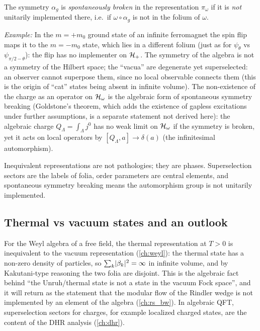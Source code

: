 \begin{definition}
The symmetry $\alpha_g$ is \emph{spontaneously broken} in the representation $\pi_\omega$ if it is \emph{not} unitarily implemented there, i.e.\ if $\omega\circ\alpha_g$ is not in the folium of $\omega$.
\end{definition}

\emph{Example:} In the $m=+m_0$ ground state of an infinite ferromagnet the spin flip maps it to the $m=-m_0$ state, which lies in a different folium (just as for $\psi_\theta$ vs $\psi_{\pi/2-\theta}$): the flip has no implementer on $\mathcal{H}_+$. The symmetry of the algebra is not a symmetry of the Hilbert space; the ``vacua'' are degenerate yet superselected: an observer cannot superpose them, since no local observable connects them (this is the origin of ``cat'' states being absent in infinite volume). The non-existence of the charge as an operator on $\mathcal{H}_\omega$ is the algebraic form of spontaneous symmetry breaking (Goldstone's theorem, which adds the existence of gapless excitations under further assumptions, is a separate statement not derived here): the algebraic charge $Q_\Lambda=\int_\Lambda j^0$ has no weak limit on $\mathcal{H}_\omega$ if the symmetry is broken, yet it acts on local operators by $[Q_\Lambda,a]\to\delta(a)$ (the infinitesimal automorphism).

\begin{keyidea}
Inequivalent representations are not pathologies; they are phases. Superselection sectors are the labels of folia, order parameters are central elements, and spontaneous symmetry breaking means the automorphism group is not unitarily implemented.
\end{keyidea}

\subsection{Thermal vs vacuum states and an outlook}

For the Weyl algebra of a free field, the thermal representation at $T>0$ is inequivalent to the vacuum representation (\cref{ch:weyl}): the thermal state has a non-zero density of particles, so $\sum_k\lvert \beta_k\rvert^2=\infty$ in infinite volume, and by Kakutani-type reasoning the two folia are disjoint. This is the algebraic fact behind ``the Unruh/thermal state is not a state in the vacuum Fock space'', and it will return as the statement that the modular flow of the Rindler wedge is not implemented by an element of the algebra (\cref{ch:rs_bw}). In algebraic QFT, superselection sectors for charges, for example localized charged states, are the content of the DHR analysis (\cref{ch:dhr}).

